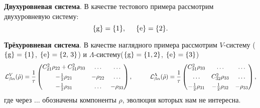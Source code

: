 \textbf{Двухуровневая система}.  В качестве тестового примера рассмотрим двухуровневую систему:
\begin{equation*}
    \{\text{g}\} = \{1\}, \hspace{5 mm} \{\text{e}\} = \{2\}.
\end{equation*}





\textbf{Трёхуровневая система}. В качестве наглядного примера рассмотрим $V$-систему ($\{\text{g}\} = \{1\}$, $\{\text{e}\} = \{2,\,  3\}$) и $\Lambda$-систему($\{\text{g}\} = \{1, 2\}$, $\{\text{e}\} = \{3\}$)
\begin{equation*}
    {\mathcal L}^V_{\beta \alpha} (\hat{\rho}) = \frac{1}{\tau}\begin{pmatrix}
        C_{21}^2 \rho_{22} + C_{31}^2 \rho_{33} & \ldots & \ldots \\[4pt]
        - \tfrac{1}{2} \rho_{21} & - \rho_{22} & \ldots \\[4pt]
        -\tfrac{1}{2} \rho_{31} & \ldots & -\rho_{33} \\
    \end{pmatrix}, \hspace{10 mm} 
    {\mathcal L}^\Lambda_{\beta \alpha} (\hat{\rho}) = \frac{1}{\tau}
    \begin{pmatrix}
        C_{31}^2 \rho_{33} & \ldots & \ldots \\[4pt]
        \ldots & C_{32}^2 \rho_{33} & \ldots \\[4pt]
        - \tfrac{1}{2} \rho_{31} & -\tfrac{1}{2} \rho_{32} & - \rho_{33} \\
    \end{pmatrix},
\end{equation*}
где через $\ldots$ обозначены компоненты $\rho$, эволюция которых нам не интересна.